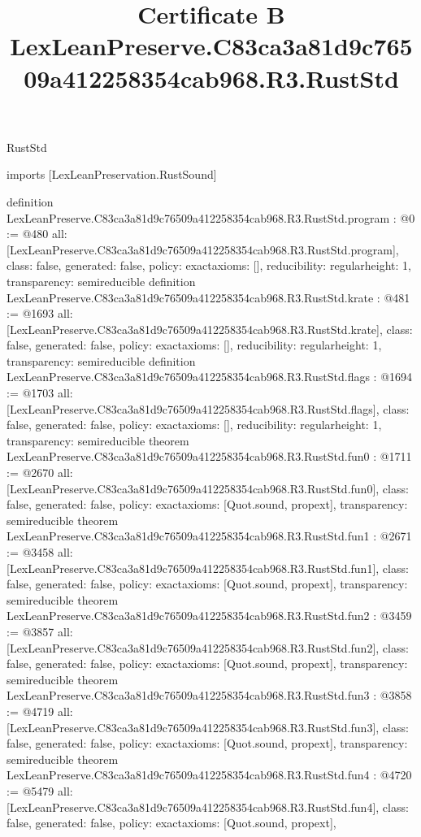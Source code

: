 \begin{lexlean}{RustStd}
\title{Certificate B LexLeanPreserve.C83ca3a81d9c76509a412258354cab968.R3.RustStd}
\begin{coremodule}
imports [LexLeanPreservation.RustSound]

definition LexLeanPreserve.C83ca3a81d9c76509a412258354cab968.R3.RustStd.program : @0 := @480 {
  all: [LexLeanPreserve.C83ca3a81d9c76509a412258354cab968.R3.RustStd.program],
  class: false,
  generated: false,
  policy: exact{axioms: []},
  reducibility: regular{height: 1},
  transparency: semireducible
}
definition LexLeanPreserve.C83ca3a81d9c76509a412258354cab968.R3.RustStd.krate : @481 := @1693 {
  all: [LexLeanPreserve.C83ca3a81d9c76509a412258354cab968.R3.RustStd.krate],
  class: false,
  generated: false,
  policy: exact{axioms: []},
  reducibility: regular{height: 1},
  transparency: semireducible
}
definition LexLeanPreserve.C83ca3a81d9c76509a412258354cab968.R3.RustStd.flags : @1694 := @1703 {
  all: [LexLeanPreserve.C83ca3a81d9c76509a412258354cab968.R3.RustStd.flags],
  class: false,
  generated: false,
  policy: exact{axioms: []},
  reducibility: regular{height: 1},
  transparency: semireducible
}
theorem LexLeanPreserve.C83ca3a81d9c76509a412258354cab968.R3.RustStd.fun0 : @1711 := @2670 {
  all: [LexLeanPreserve.C83ca3a81d9c76509a412258354cab968.R3.RustStd.fun0],
  class: false,
  generated: false,
  policy: exact{axioms: [Quot.sound, propext]},
  transparency: semireducible
}
theorem LexLeanPreserve.C83ca3a81d9c76509a412258354cab968.R3.RustStd.fun1 : @2671 := @3458 {
  all: [LexLeanPreserve.C83ca3a81d9c76509a412258354cab968.R3.RustStd.fun1],
  class: false,
  generated: false,
  policy: exact{axioms: [Quot.sound, propext]},
  transparency: semireducible
}
theorem LexLeanPreserve.C83ca3a81d9c76509a412258354cab968.R3.RustStd.fun2 : @3459 := @3857 {
  all: [LexLeanPreserve.C83ca3a81d9c76509a412258354cab968.R3.RustStd.fun2],
  class: false,
  generated: false,
  policy: exact{axioms: [Quot.sound, propext]},
  transparency: semireducible
}
theorem LexLeanPreserve.C83ca3a81d9c76509a412258354cab968.R3.RustStd.fun3 : @3858 := @4719 {
  all: [LexLeanPreserve.C83ca3a81d9c76509a412258354cab968.R3.RustStd.fun3],
  class: false,
  generated: false,
  policy: exact{axioms: [Quot.sound, propext]},
  transparency: semireducible
}
theorem LexLeanPreserve.C83ca3a81d9c76509a412258354cab968.R3.RustStd.fun4 : @4720 := @5479 {
  all: [LexLeanPreserve.C83ca3a81d9c76509a412258354cab968.R3.RustStd.fun4],
  class: false,
  generated: false,
  policy: exact{axioms: [Quot.sound, propext]},
}
\end{coremodule}
\end{lexlean}
